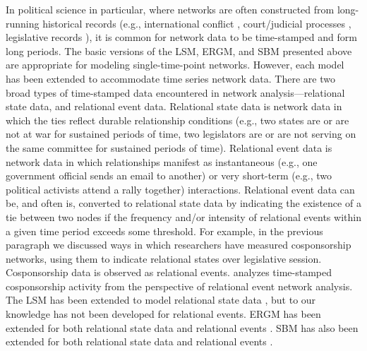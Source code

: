 \documentclass[fleqn,12pt]{wlscirep}
\begin{document}
In political science in particular, where networks are often constructed from long-running historical records (e.g., international conflict \citep{li2017three}, court/judicial processes \citep{box2014evolution}, legislative records \citep{ringe2013bridging}), it is common for network data to be time-stamped and form long periods. The basic versions of the LSM, ERGM, and SBM presented above are appropriate for modeling single-time-point networks. However, each model has been extended to accommodate time series network data. There are two broad types of time-stamped data encountered in network analysis---relational state data, and relational event data. Relational state data is network data in which the ties reflect durable relationship conditions (e.g., two states are or are not at war for sustained periods of time, two legislators are or are not serving on the same committee for sustained periods of time). Relational event data is network data in which relationships manifest as instantaneous (e.g., one government official sends an email to another) or very short-term (e.g., two political activists attend a rally together) interactions. Relational event data can be, and often is, converted to relational state data by indicating the existence of a tie between two nodes if the frequency and/or intensity of relational events within a given time period exceeds some threshold. For example, in the previous paragraph we discussed ways in which researchers have measured cosponsorship networks, using them to indicate relational states over legislative session. Cosponsorship data is observed as relational events. \cite{brandenberger2018trading} analyzes time-stamped cosponsorship activity from the perspective of relational event network analysis. The LSM has been extended to model relational state data \citep{sewell2015latent}, but to our knowledge has not been developed for relational events. ERGM has been extended for both relational state data \citep{hanneke2010discrete} and relational events \citep{perry2013point}.  SBM has also been extended for both relational state data \citep{xu2014dynamic} and relational events \citep{dubois2013stochastic}. 
\end{document}
